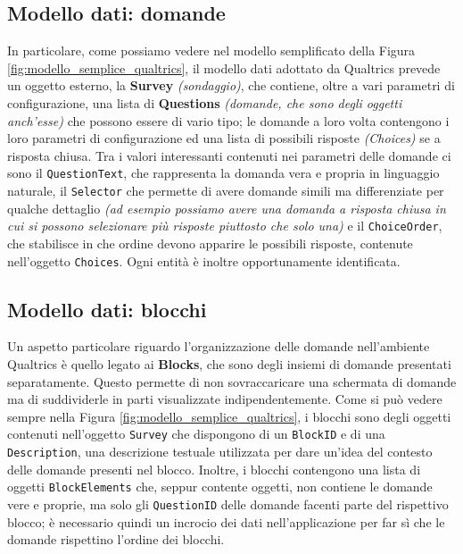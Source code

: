 \subsection{Modello dati: domande}
In particolare, come possiamo vedere nel modello semplificato della Figura \ref{fig:modello_semplice_qualtrics}, il modello dati adottato da Qualtrics prevede un oggetto esterno, la \textbf{Survey} \textit{(sondaggio)}, che contiene, oltre a vari parametri di configurazione, una lista di \textbf{Questions} \textit{(domande, che sono degli oggetti anch'esse)} che possono essere di vario tipo; le domande a loro volta contengono i loro parametri di configurazione ed una lista di possibili risposte \textit{(Choices)} se a risposta chiusa.
Tra i valori interessanti contenuti nei parametri delle domande ci sono il \texttt{QuestionText}, che rappresenta la domanda vera e propria in linguaggio naturale, il \texttt{Selector} che permette di avere domande simili ma differenziate per qualche dettaglio \textit{(ad esempio possiamo avere una domanda a risposta chiusa in cui si possono selezionare più risposte piuttosto che solo una)} e il \texttt{ChoiceOrder}, che stabilisce in che ordine devono apparire le possibili risposte, contenute nell'oggetto \texttt{Choices}.
Ogni entità è inoltre opportunamente identificata.

\newpage

\subsection{Modello dati: blocchi}
Un aspetto particolare riguardo l'organizzazione delle domande nell'ambiente Qualtrics è quello legato ai \textbf{Blocks}, che sono degli insiemi di domande presentati separatamente. Questo permette di non sovraccaricare una schermata di domande ma di suddividerle in parti visualizzate indipendentemente.
Come si può vedere sempre nella Figura \ref{fig:modello_semplice_qualtrics}, i blocchi sono degli oggetti contenuti nell'oggetto \texttt{Survey} che dispongono di un \texttt{BlockID} e di una \texttt{Description}, una descrizione testuale utilizzata per dare un'idea del contesto delle domande presenti nel blocco. Inoltre, i blocchi contengono una lista di oggetti \texttt{BlockElements} che, seppur contente oggetti, non contiene le domande vere e proprie, ma solo gli \texttt{QuestionID} delle domande facenti parte del rispettivo blocco; è necessario quindi un incrocio dei dati nell'applicazione per far sì che le domande rispettino l'ordine dei blocchi.

